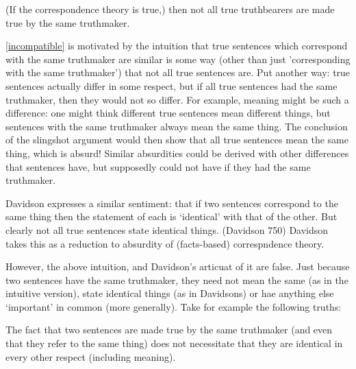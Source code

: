 

	\begin{thesis} \label{incompatible}
	(If the correspondence theory is true,) then not all true truthbearers are made true by the same truthmaker.
	\end{thesis}

\ref{incompatible} is motivated by the intuition that true sentences which correspond with the same truthmaker are similar is some way (other than just 'corresponding with the same truthmaker') that not all true sentences are.
Put another way: true sentences actually differ in some respect, but if all true sentences had the same truthmaker, then they would not so differ.
For example, meaning might be such a difference: one might think different true sentences mean different things, but sentences with the same truthmaker always mean the same thing.
The conclusion of the slingshot argument would then show that all true sentences mean the same thing, which is absurd!
Similar absurdities could be derived with other differences that sentences have, but supposedly could not have if they had the same truthmaker.

Davidson expresses a similar sentiment: that if two sentences correspond to the same thing then the statement of each is `identical' with that of the other.
But clearly not all true sentences state identical things.
(Davidson 750)
Davidson takes this as a reduction to absurdity of (facts-based) correspndence theory.  %


However, the above intuition, and Davidson's articuat of it are false.
Just because two sentences have the same truthmaker, they need not mean the same (as in the intuitive version), state identical things (as in Davidsons) or hae anything else `important' in common (more generally).
Take for example the following truths:


The fact that two sentences are made true by the same truthmaker (and even that they refer to the same thing) does not necessitate that they are identical in every other respect (including meaning).

